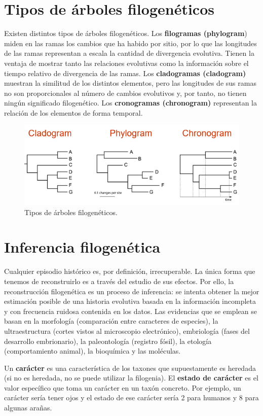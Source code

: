 \section{Tipos de árboles filogenéticos}
Existen distintos tipos de árboles filogenéticos. Los \textbf{filogramas (phylogram}) miden en las ramas los cambios que ha habido por sitio, por lo que las longitudes de las ramas representan a escala la cantidad de divergencia evolutiva. Tienen la ventaja de mostrar tanto las relaciones evolutivas como la información sobre el tiempo relativo de divergencia de las ramas. Los \textbf{cladogramas (cladogram)} muestran la similitud de los distintos elementos, pero las longitudes de sus ramas no son proporcionales al número de cambios evolutivos y, por tanto, no tienen ningún significado filogenético. Los \textbf{cronogramas (chronogram)} representan la relación de los elementos de forma temporal.

\begin{figure}[htbp]
\centering
\includegraphics[width=0.5\linewidth]{figs/tipos-arboles.png}
\caption{Tipos de árboles filogenéticos.}
\end{figure}

\section{Inferencia filogenética}
Cualquier episodio histórico es, por definición, irrecuperable. La única forma que tenemos de reconstruirlo es a través del estudio de sus efectos. Por ello, la reconstrucción filogenética es un proceso de inferencia: se intenta obtener la mejor estimación posible de una historia evolutiva basada en la información incompleta y con frecuencia ruidosa contenida en los datos. Las evidencias que se emplean se basan en la morfología (comparación entre caracteres de especies), la ultraestructura (cortes vistos al microscopio electrónico), embriología (fases del desarrollo embrionario), la paleontología (registro fósil), la etología (comportamiento animal), la bioquímica y las moléculas. 

Un \textbf{carácter} es una característica de los taxones que supuestamente es heredada (si no es heredada, no se puede utilizar la filogenia). El \textbf{estado de carácter} es el valor específico que toma un carácter en un taxón concreto. Por ejemplo, un carácter sería tener ojos y el estado de ese carácter sería 2 para humanos y 8 para algunas arañas.

